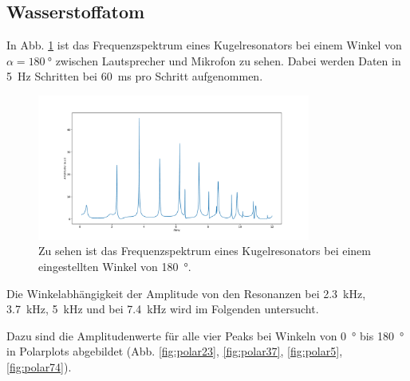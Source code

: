\subsection{Wasserstoffatom}

In Abb. \ref{fig:Wasserstoff1} ist das Frequenzspektrum eines Kugelresonators bei einem Winkel von $\alpha = \SI{180}{\degree}$ zwischen Lautsprecher und Mikrofon zu sehen. %
Dabei werden Daten in \SI{5}{\hertz} Schritten bei \SI{60}{\milli\second} pro Schritt aufgenommen. %

\begin{figure}
    \centering
    \includegraphics[width=0.8\textwidth]{plots/C_1.pdf}
    \caption{Zu sehen ist das Frequenzspektrum eines Kugelresonators bei einem eingestellten Winkel von \SI{180}{\degree}.}
    \label{fig:Wasserstoff1}
\end{figure}

Die Winkelabhängigkeit der Amplitude von den Resonanzen bei \SI{2.3}{\kilo\hertz}, \SI{3.7}{\kilo\hertz}, \SI{5}{\kilo\hertz} und bei \SI{7.4}{\kilo\hertz} wird im Folgenden untersucht. 

Dazu sind die Amplitudenwerte für alle vier Peaks bei Winkeln von \SI{0}{\degree} bis \SI{180}{\degree} in Polarplots abgebildet (Abb. \ref{fig:polar23}, \ref{fig:polar37}, \ref{fig:polar5}, \ref{fig:polar74}).


